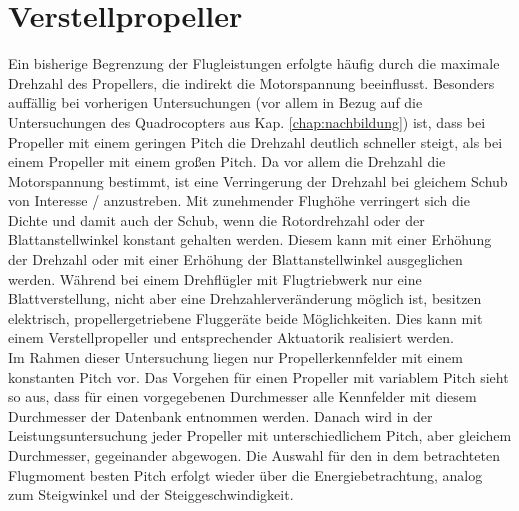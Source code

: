 \section{Verstellpropeller}
\label{sec:verstellprop}
Ein bisherige Begrenzung der Flugleistungen erfolgte häufig durch die maximale Drehzahl des Propellers, die indirekt die Motorspannung beeinflusst. 
Besonders auffällig bei vorherigen Untersuchungen (vor allem in Bezug auf die Untersuchungen des Quadrocopters aus Kap. \ref{chap:nachbildung})  ist, dass bei Propeller mit einem geringen Pitch die Drehzahl deutlich schneller steigt, als bei einem Propeller mit einem großen Pitch. Da vor allem die Drehzahl die Motorspannung bestimmt, ist eine Verringerung der Drehzahl bei gleichem Schub von Interesse / anzustreben. Mit zunehmender Flughöhe verringert sich die Dichte und damit auch der Schub, wenn die Rotordrehzahl oder der Blattanstellwinkel konstant gehalten werden. Diesem kann mit einer Erhöhung der Drehzahl oder mit einer Erhöhung der Blattanstellwinkel ausgeglichen werden. Während bei einem Drehflügler mit Flugtriebwerk nur eine Blattverstellung, nicht aber eine Drehzahlerveränderung möglich ist, besitzen elektrisch, propellergetriebene Fluggeräte beide Möglichkeiten. Dies kann mit einem Verstellpropeller und entsprechender Aktuatorik realisiert werden. \\
Im Rahmen dieser Untersuchung liegen nur Propellerkennfelder mit einem konstanten Pitch vor. Das Vorgehen für einen Propeller mit variablem Pitch sieht so aus, dass für einen vorgegebenen Durchmesser alle Kennfelder mit diesem Durchmesser der Datenbank entnommen werden. Danach wird in der Leistungsuntersuchung jeder Propeller mit unterschiedlichem Pitch, aber gleichem Durchmesser, gegeinander abgewogen. Die Auswahl für den in dem betrachteten Flugmoment besten Pitch erfolgt wieder über die Energiebetrachtung, analog zum Steigwinkel und der Steiggeschwindigkeit.


